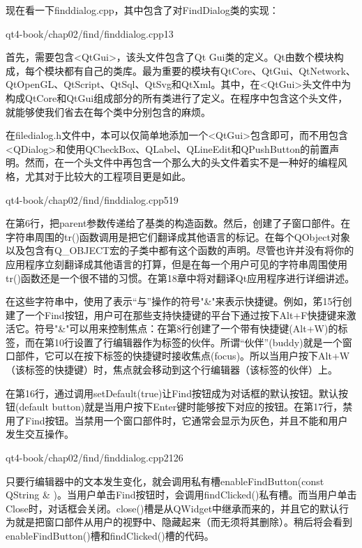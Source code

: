 \documentclass[11pt,oneside]{book}
\begin{document}
\begin{common-format}
现在看一下finddialog.cpp，其中包含了对FindDialog类的实现：
\begin{cppline}{qt4-book/chap02/find/finddialog.cpp}{1}{3}
\end{cppline}

首先，需要包含<QtGui>，该头文件包含了Qt Gui类的定义。Qt由数个模块构成，每个模块都有自己的类库。最为重要的模块有QtCore、QtGui、QtNetwork、QtOpenGL、QtScript、QtSql、QtSvg和QtXml。其中，在<QtGui>头文件中为构成QtCore和QtGui组成部分的所有类进行了定义。在程序中包含这个头文件，就能够使我们省去在每个类中分别包含的麻烦。

在filedialog.h文件中，本可以仅简单地添加一个<QtGui>包含即可，而不用包含<QDialog>和使用QCheckBox、QLabel、QLineEdit和QPushButton的前置声明。然而，在一个头文件中再包含一个那么大的头文件着实不是一种好的编程风格，尤其对于比较大的工程项目更是如此。

\begin{cppline}{qt4-book/chap02/find/finddialog.cpp}{5}{19}
\end{cppline}

在第6行，把parent参数传递给了基类的构造函数。然后，创建了子窗口部件。在字符串周围的tr()函数调用是把它们翻译成其他语言的标记。在每个QObject对象以及包含有Q\_{}OBJECT宏的子类中都有这个函数的声明。尽管也许并没有将你的应用程序立刻翻译成其他语言的打算，但是在每一个用户可见的字符串周围使用tr()函数还是一个很不错的习惯。在第18章中将对翻译Qt应用程序进行详细讲述。

在这些字符串中，使用了表示“与”操作的符号"\&{}"来表示快捷键。例如，笫15行创建了一个Find按钮，用户可在那些支持快捷键的平台下通过按下Alt+F快捷键来激活它。符号"\&{}"可以用来控制焦点：在第8行创建了一个带有快捷键(Alt+W)的标签，而在第10行设置了行编辑器作为标签的伙伴。所谓“伙伴”(buddy)就是一个窗口部件，它可以在按下标签的快捷键时接收焦点(focus)。所以当用户按下Alt+W（该标签的快捷键）时，焦点就会移动到这个行编辑器（该标签的伙伴）上。

在第16行，通过调用setDefault(true)让Find按钮成为对话框的默认按钮。默认按钮(default button)就是当用户按下Enter键时能够按下对应的按钮。在第17行，禁用了Find按钮。当禁用一个窗口部件时，它通常会显示为灰色，并且不能和用户发生交互操作。

\begin{cppline}{qt4-book/chap02/find/finddialog.cpp}{21}{26}
\end{cppline}

只要行编辑器中的文本发生变化，就会调用私有槽enableFindButton(const QString \& )。当用户单击Find按钮时，会调用findClicked()私有槽。而当用户单击Close时，对话框会关闭。close()槽是从QWidget中继承而来的，并且它的默认行为就是把窗口部件从用户的视野中、隐藏起来（而无须将其删除）。稍后将会看到enableFindButton()槽和findClicked()槽的代码。


\end{common-format}
\end{document}
